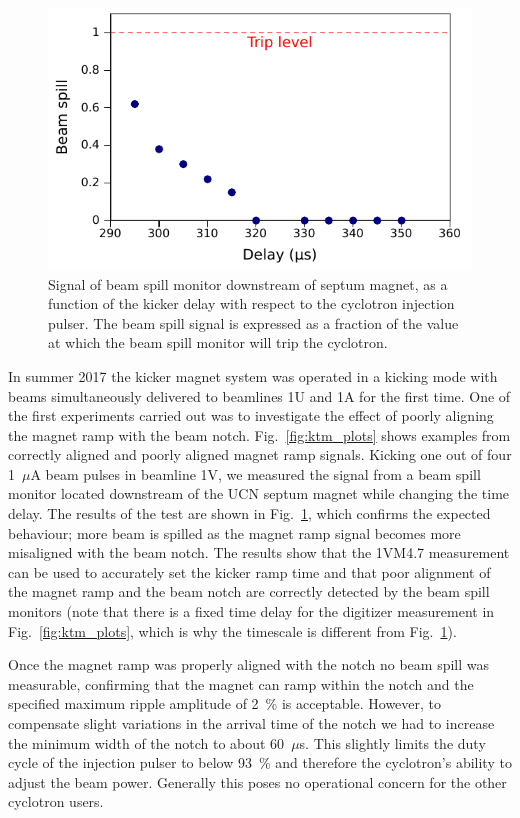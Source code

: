 \documentclass[aps,prab,twocolumn,superscriptaddress]{revtex4-1}
\begin{document}
\begin{figure}%
\includegraphics[width=\linewidth]{BeamSpill.pdf}

\caption{Signal of beam spill monitor downstream of septum magnet, as a function of the kicker delay with respect to the cyclotron injection pulser.  The beam spill signal is expressed as a fraction of the value at which the beam spill monitor will trip the cyclotron.}
\label{fig:ktm_mistimg}
\end{figure}

In summer 2017 the kicker magnet system was operated in a kicking mode with beams simultaneously delivered to beamlines 1U and 1A for the first time.  One of the first experiments carried out was to investigate the effect of poorly aligning the magnet ramp with the beam notch.  Fig.~\ref{fig:ktm_plots} shows examples from correctly aligned and poorly aligned magnet ramp signals. Kicking one out of four 1~$\mu$A beam pulses in beamline 1V, we measured the signal from a beam spill monitor located downstream of the UCN septum magnet while changing the time delay.  The results of the test are shown in Fig.~\ref{fig:ktm_mistimg}, which confirms the expected behaviour; more beam is spilled as the magnet ramp signal becomes more misaligned with the beam notch.  The results show that the 1VM4.7 measurement can be used to accurately set the kicker ramp time and that poor alignment of the magnet ramp and the beam notch are correctly detected by the beam spill monitors (note that there is a fixed time delay for the digitizer measurement in Fig.~\ref{fig:ktm_plots}, which is why the timescale is different from  Fig.~\ref{fig:ktm_mistimg}).

Once the magnet ramp was properly aligned with the notch no beam spill was measurable, confirming that the magnet can ramp within the notch and the specified maximum ripple amplitude of 2~\% is acceptable. However, to compensate slight variations in the arrival time of the notch we had to increase the minimum width of the notch to about 60~$\mu$s. This slightly limits the duty cycle of the injection pulser to below 93~\% and therefore the cyclotron's ability to adjust the beam power.  Generally this poses no operational concern for the other cyclotron users.
\end{document}
